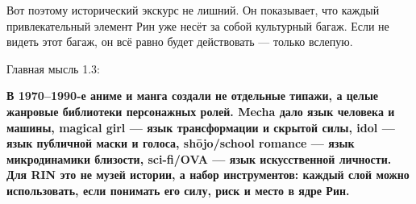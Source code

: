 Вот поэтому исторический экскурс не лишний. Он показывает, что каждый
привлекательный элемент Рин уже несёт за собой культурный багаж. Если не
видеть этот багаж, он всё равно будет действовать --- только вслепую.

Главная мысль 1.3:

\textbf{В 1970--1990-е аниме и манга создали не отдельные типажи, а
целые жанровые библиотеки персонажных ролей. Mecha дало язык человека и
машины, magical girl --- язык трансформации и скрытой силы, idol ---
язык публичной маски и голоса, shōjo/\hspace{0pt}school romance --- язык
микродинамики близости, sci-fi/\hspace{0pt}OVA --- язык искусственной личности. Для
RIN это не музей истории, а набор инструментов: каждый слой можно
использовать, если понимать его силу, риск и место в ядре Рин.}

